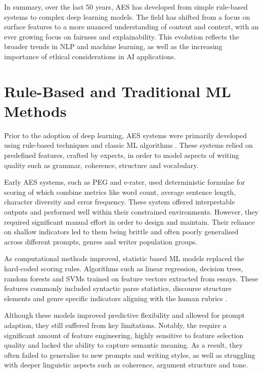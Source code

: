 \documentclass[10pt]{report}
\begin{document}
In summary, over the last 50 years, AES has developed from simple rule-based systems to complex deep learning models. The field has shifted from a focus on surface features to a more nuanced understanding of content and context, with an ever growing focus on fairness and explainability. This evolution reflects the broader trends in NLP and machine learning, as well as the increasing importance of ethical considerations in AI applications.

\section{Rule-Based and Traditional ML Methods}
Prior to the adoption of deep learning, AES systems were primarily developed using rule-based techniques and classic ML algorithms \parencite{shermis2013handbook}. These systems relied on predefined features, crafted by expects, in order to model aspects of writing quality such as grammar, coherence, structure and vocabulary. 

Early AES systems, such as PEG and e-rater, used deterministic formulae for scoring of which combine metrics like word count, average sentence length, character diversity and error frequency. These system offered interpretable outputs and performed well within their constrained environments. However, they required significant manual effort in order to design and maintain. Their reliance on shallow indicators led to them being brittle and often poorly generalised across different prompts, genres and writer population groups.

As computational methods improved, statistic based ML models replaced the hard-coded scoring rules. Algorithms such as linear regression, decision trees, random forests and SVMs trained on feature vectors extracted from essays. These features commonly included syntactic parse statistics, discourse structure elements and genre specific indicators aligning with the human rubrics \parencite{taghipour2016neural}.

Although these models improved predictive flexibility and allowed for prompt adaption,   they still suffered from key limitations. Notably, the require a significant amount of feature engineering, highly sensitive to feature selection quality and lacked the ability to capture semantic meaning. As a result, they often failed to generalise to new prompts and writing styles, as well as struggling with deeper linguistic aspects such as coherence, argument structure and tone. 
\end{document}
